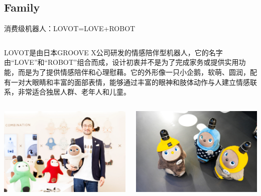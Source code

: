 \documentclass{beamer}
\begin{document}
\subsection{Family}
\begin{frame}{消费级机器人：LOVOT=LOVE+ROBOT}

\begin{columns}[c, onlytextwidth]
\begin{column}{0.65\textwidth}
\scriptsize{LOVOT是由日本GROOVE X公司研发的情感陪伴型机器人，它的名字由“LOVE”和“ROBOT”组合而成，设计初衷并不是为了完成家务或提供实用功能，而是为了提供情感陪伴和心理慰藉。它的外形像一只小企鹅，软萌、圆润，配有一对大眼睛和丰富的面部表情，能够通过丰富的眼神和肢体动作与人建立情感联系，非常适合独居人群、老年人和儿童。}
\smallskip
\begin{columns}[c, onlytextwidth]
\begin{column}{0.48\textwidth}
\includegraphics[width=\textwidth]{family/2.png}
\end{column}
\begin{column}{0.48\textwidth}
\includegraphics[width=\textwidth]{family/3.jpg}
\end{column}
\end{columns}
\end{column}


\end{columns}
\end{frame}
\end{document}
